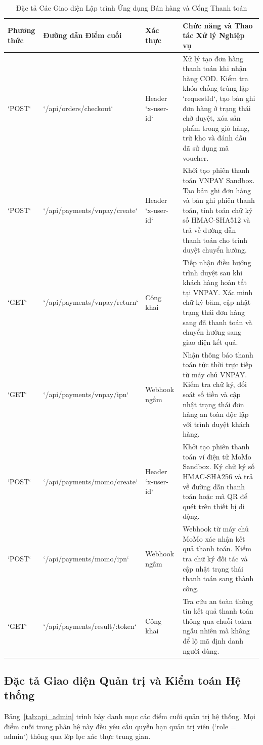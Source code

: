 \begin{table}[H]
\centering
\caption{Đặc tả Các Giao diện Lập trình Ứng dụng Bán hàng và Cổng Thanh toán}
\label{tab:api_orders}
\begin{tabularx}{\textwidth}{p{1.8cm}p{4cm}p{2cm}X}
\toprule
\textbf{Phương thức} & \textbf{Đường dẫn Điểm cuối} & \textbf{Xác thực} & \textbf{Chức năng và Thao tác Xử lý Nghiệp vụ} \\
\midrule
`POST` & `/api/orders/checkout` & Header `x-user-id` & Xử lý tạo đơn hàng thanh toán khi nhận hàng COD. Kiểm tra khóa chống trùng lặp `requestId`, tạo bản ghi đơn hàng ở trạng thái chờ duyệt, xóa sản phẩm trong giỏ hàng, trừ kho và đánh dấu đã sử dụng mã voucher. \\
\addlinespace
`POST` & `/api/payments/vnpay/create` & Header `x-user-id` & Khởi tạo phiên thanh toán VNPAY Sandbox. Tạo bản ghi đơn hàng và bản ghi phiên thanh toán, tính toán chữ ký số HMAC-SHA512 và trả về đường dẫn thanh toán cho trình duyệt chuyển hướng. \\
\addlinespace
`GET` & `/api/payments/vnpay/return` & Công khai & Tiếp nhận điều hướng trình duyệt sau khi khách hàng hoàn tất tại VNPAY. Xác minh chữ ký băm, cập nhật trạng thái đơn hàng sang đã thanh toán và chuyển hướng sang giao diện kết quả. \\
\addlinespace
`GET` & `/api/payments/vnpay/ipn` & Webhook ngầm & Nhận thông báo thanh toán tức thời trực tiếp từ máy chủ VNPAY. Kiểm tra chữ ký, đối soát số tiền và cập nhật trạng thái đơn hàng an toàn độc lập với trình duyệt khách hàng. \\
\addlinespace
`POST` & `/api/payments/momo/create` & Header `x-user-id` & Khởi tạo phiên thanh toán ví điện tử MoMo Sandbox. Ký chữ ký số HMAC-SHA256 và trả về đường dẫn thanh toán hoặc mã QR để quét trên thiết bị di động. \\
\addlinespace
`POST` & `/api/payments/momo/ipn` & Webhook ngầm & Webhook từ máy chủ MoMo xác nhận kết quả thanh toán. Kiểm tra chữ ký đối tác và cập nhật trạng thái thanh toán sang thành công. \\
\addlinespace
`GET` & `/api/payments/result/:token` & Công khai & Tra cứu an toàn thông tin kết quả thanh toán thông qua chuỗi token ngẫu nhiên mà không để lộ mã định danh người dùng. \\
\bottomrule
\end{tabularx}
\end{table}

\subsection{Đặc tả Giao diện Quản trị và Kiểm toán Hệ thống}
Bảng~\ref{tab:api_admin} trình bày danh mục các điểm cuối quản trị hệ thống. Mọi điểm cuối trong phân hệ này đều yêu cầu quyền hạn quản trị viên (`role = admin`) thông qua lớp lọc xác thực trung gian.

